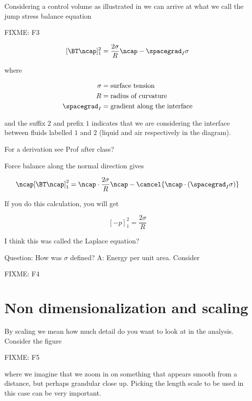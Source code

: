 Considering a control volume as illustrated in we can arrive at what we call the jump stress balance equation

FIXME: F3

\begin{equation}\label{eqn:continuumL14:130}
[\BT \ncap]^2_1 = \frac{2 \sigma}{R} \ncap - \spacegrad_I \sigma
\end{equation}

where

\begin{align}\label{eqn:continuumL14:150}
\sigma &= \text{surface tension} \\
R &= \text{radius of curvature} \\
\spacegrad_I &= \text{gradient along the interface}
\end{align}

and the suffix $2$ and prefix $1$ indicates that we are considering the interface between fluids labelled $1$ and $2$ (liquid and air respectively in the diagram).

For a derivation see Prof after class?

Force balance along the normal direction gives

\begin{equation}\label{eqn:continuumL14:170}
\ncap [\BT \ncap]^2_1 = \ncap \cdot \frac{2 \sigma}{R} \ncap - \cancel{\ncap \cdot (\spacegrad_I \sigma)}
\end{equation}

If you do this calculation, you will get 

\begin{equation}\label{eqn:continuumL14:190}
[-p]^2_1 = \frac{ 2 \sigma}{R}
\end{equation}

I think this was called the Laplace equation?

Question: How was $\sigma$ defined?  A: Energy per unit area.  Consider

FIXME: F4

\section{Non dimensionalization and scaling}

By scaling we mean how much detail do you want to look at in the analysis.  Consider the figure

FIXME: F5

where we imagine that we zoom in on something that appears smooth from a distance, but perhaps grandular close up.  Picking the length scale to be used in this case can be very important.

